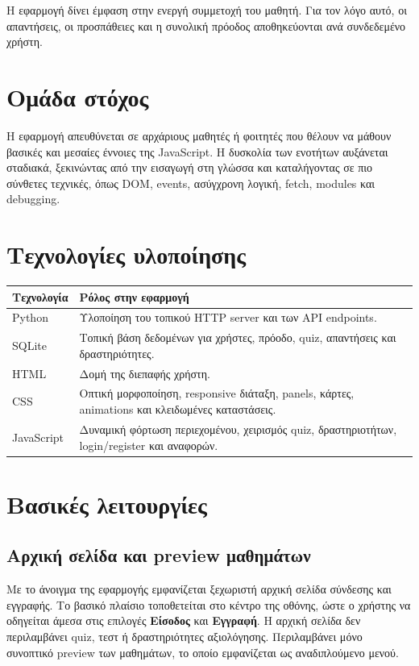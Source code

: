 \documentclass[12pt,a4paper]{article}
\newcommand{\textlatin}[1]{\textenglish{#1}}
\begin{document}
Η εφαρμογή δίνει έμφαση στην ενεργή συμμετοχή του μαθητή. Για τον λόγο αυτό, οι απαντήσεις, οι προσπάθειες και η συνολική πρόοδος αποθηκεύονται ανά συνδεδεμένο χρήστη.

\section{Ομάδα στόχος}

Η εφαρμογή απευθύνεται σε αρχάριους μαθητές ή φοιτητές που θέλουν να μάθουν βασικές και μεσαίες έννοιες της \textlatin{JavaScript}. Η δυσκολία των ενοτήτων αυξάνεται σταδιακά, ξεκινώντας από την εισαγωγή στη γλώσσα και καταλήγοντας σε πιο σύνθετες τεχνικές, όπως \textlatin{DOM}, \textlatin{events}, ασύγχρονη λογική, \textlatin{fetch}, \textlatin{modules} και debugging.

\section{Τεχνολογίες υλοποίησης}

\begin{longtable}{|p{4cm}|p{10cm}|}
\hline
\textbf{Τεχνολογία} & \textbf{Ρόλος στην εφαρμογή} \\
\hline
\textlatin{Python} & Υλοποίηση του τοπικού \textlatin{HTTP server} και των \textlatin{API endpoints}. \\
\hline
\textlatin{SQLite} & Τοπική βάση δεδομένων για χρήστες, πρόοδο, quiz, απαντήσεις και δραστηριότητες. \\
\hline
\textlatin{HTML} & Δομή της διεπαφής χρήστη. \\
\hline
\textlatin{CSS} & Οπτική μορφοποίηση, responsive διάταξη, panels, κάρτες, animations και κλειδωμένες καταστάσεις. \\
\hline
\textlatin{JavaScript} & Δυναμική φόρτωση περιεχομένου, χειρισμός quiz, δραστηριοτήτων, login/register και αναφορών. \\
\hline
\end{longtable}

\section{Βασικές λειτουργίες}

\subsection{Αρχική σελίδα και preview μαθημάτων}

Με το άνοιγμα της εφαρμογής εμφανίζεται ξεχωριστή αρχική σελίδα σύνδεσης και εγγραφής. Το βασικό πλαίσιο τοποθετείται στο κέντρο της οθόνης, ώστε ο χρήστης να οδηγείται άμεσα στις επιλογές \textbf{Είσοδος} και \textbf{Εγγραφή}. Η αρχική σελίδα δεν περιλαμβάνει quiz, τεστ ή δραστηριότητες αξιολόγησης. Περιλαμβάνει μόνο συνοπτικό preview των μαθημάτων, το οποίο εμφανίζεται ως αναδιπλούμενο μενού.
\end{document}
